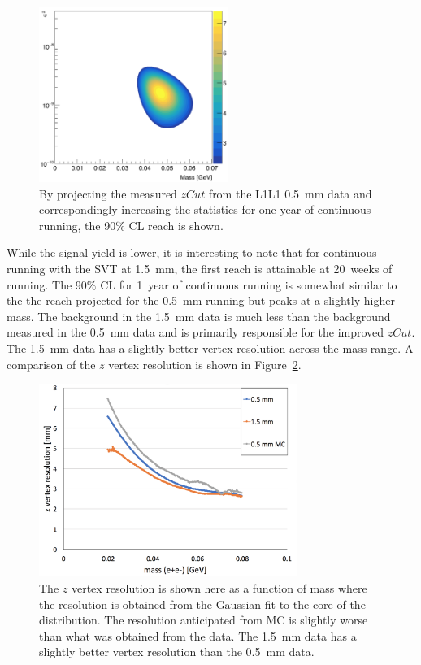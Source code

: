 \begin{figure}[htb]
  \centering
      \includegraphics[width=0.55\textwidth]{pics/results/signal_1yr.png}
  \caption[Projected reach for one year of running at 0.5~mm]{By projecting the measured $zCut$ from the L1L1 0.5~mm data and correspondingly increasing the statistics for one year of continuous running, the 90$\%$ CL reach is shown.}
  \label{fig:reach_1yr}
\end{figure} 

While the signal yield is lower, it is interesting to note that for continuous running with the SVT at 1.5~mm, the first reach is attainable at 20~weeks of running. The 90$\%$ CL for 1~year of continuous running is somewhat similar to the the reach projected for the 0.5~mm running but peaks at a slightly higher mass. The background in the 1.5~mm data is much less than the background measured in the 0.5~mm data and is primarily responsible for the improved $zCut$. The 1.5~mm data has a slightly better vertex resolution across the mass range. A comparison of the $z$ vertex resolution is shown in Figure~\ref{fig:vtxRes}. 

\begin{figure}[htb]
  \centering
      \includegraphics[width=0.75\textwidth]{pics/results/vtxRes.png}
  \caption[Vertex resolutions as measured in data and compared]{The $z$ vertex resolution is shown here as a function of mass where the resolution is obtained from the Gaussian fit to the core of the distribution. The resolution anticipated from MC is slightly worse than what was obtained from the data. The 1.5~mm data has a slightly better vertex resolution than the 0.5~mm data.}
  \label{fig:vtxRes}
\end{figure}

